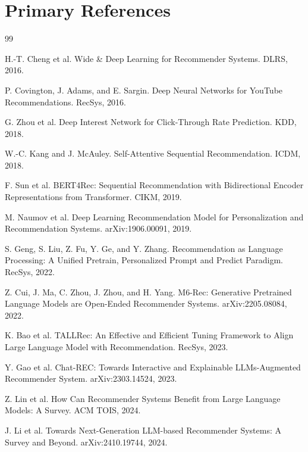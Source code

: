 \documentclass[11pt]{article}
\begin{document}
\section{Primary References}

\begin{thebibliography}{99}

H.-T. Cheng et al.
\newblock Wide \& Deep Learning for Recommender Systems.
\newblock DLRS, 2016.

P. Covington, J. Adams, and E. Sargin.
\newblock Deep Neural Networks for YouTube Recommendations.
\newblock RecSys, 2016.

G. Zhou et al.
\newblock Deep Interest Network for Click-Through Rate Prediction.
\newblock KDD, 2018.

W.-C. Kang and J. McAuley.
\newblock Self-Attentive Sequential Recommendation.
\newblock ICDM, 2018.

F. Sun et al.
\newblock BERT4Rec: Sequential Recommendation with Bidirectional Encoder Representations from Transformer.
\newblock CIKM, 2019.

M. Naumov et al.
\newblock Deep Learning Recommendation Model for Personalization and Recommendation Systems.
\newblock arXiv:1906.00091, 2019.

S. Geng, S. Liu, Z. Fu, Y. Ge, and Y. Zhang.
\newblock Recommendation as Language Processing: A Unified Pretrain, Personalized Prompt and Predict Paradigm.
\newblock RecSys, 2022.

Z. Cui, J. Ma, C. Zhou, J. Zhou, and H. Yang.
\newblock M6-Rec: Generative Pretrained Language Models are Open-Ended Recommender Systems.
\newblock arXiv:2205.08084, 2022.

K. Bao et al.
\newblock TALLRec: An Effective and Efficient Tuning Framework to Align Large Language Model with Recommendation.
\newblock RecSys, 2023.

Y. Gao et al.
\newblock Chat-REC: Towards Interactive and Explainable LLMs-Augmented Recommender System.
\newblock arXiv:2303.14524, 2023.

Z. Lin et al.
\newblock How Can Recommender Systems Benefit from Large Language Models: A Survey.
\newblock ACM TOIS, 2024.

J. Li et al.
\newblock Towards Next-Generation LLM-based Recommender Systems: A Survey and Beyond.
\newblock arXiv:2410.19744, 2024.


\end{thebibliography}
\end{document}
